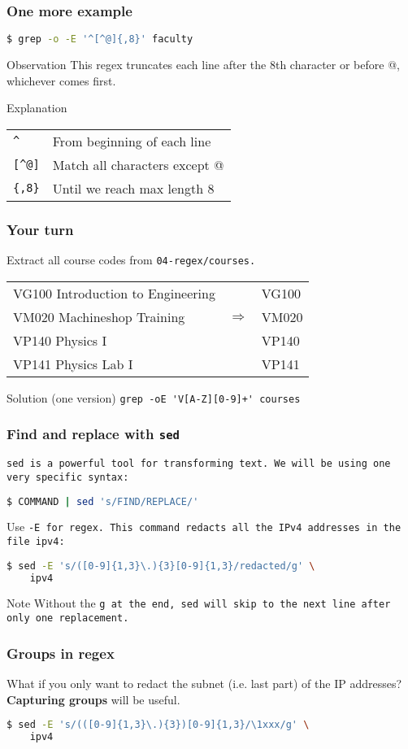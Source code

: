 \begin{frame}[fragile]
\frametitle{One more example}
\begin{lstlisting}[language=bash]
$ grep -o -E '^[^@]{,8}' faculty
\end{lstlisting}
\pause
\begin{block}{Observation}
    This regex truncates each line after the 8th character or before @,
    whichever comes first.
\end{block}
\begin{block}{Explanation}
    \begin{tabular}{ll}
        \verb|^|    & From beginning of each line \\
        \verb|[^@]| & Match all characters except @ \\
        \verb|{,8}| & Until we reach max length 8
    \end{tabular}
\end{block}
\end{frame}

\begin{frame}[fragile]
\frametitle{Your turn}
Extract all course codes from \tt{04-regex/courses}. \newline

\begin{tabular}{lcl}
    VG100 Introduction to Engineering & & VG100 \\
    VM020 Machineshop Training & $\Longrightarrow$ & VM020 \\
    VP140 Physics I & & VP140 \\
    VP141 Physics Lab I & & VP141
\end{tabular}
\pause
\begin{block}{Solution (one version)}
    \verb|grep -oE 'V[A-Z][0-9]+' courses|
\end{block}
\end{frame}

\begin{frame}[fragile]
\frametitle{Find and replace with \tt{sed}}
\tt{sed} is a powerful tool for transforming text.
We will be using one very specific syntax:
\begin{lstlisting}[language=bash]
$ COMMAND | sed 's/FIND/REPLACE/'
\end{lstlisting}
Use \tt{-E} for regex. This command redacts all the IPv4 addresses in the
file \tt{ipv4}:
\begin{lstlisting}[language=bash]
$ sed -E 's/([0-9]{1,3}\.){3}[0-9]{1,3}/redacted/g' \
    ipv4
\end{lstlisting}
\begin{block}{Note}
    Without the \tt{g} at the end, \tt{sed} will skip to the
    next line after only one replacement.
\end{block}
\end{frame}

\begin{frame}[fragile]
\frametitle{Groups in regex}
What if you only want to redact the subnet (i.e. last part) of the IP addresses?
\textbf{Capturing groups} will be useful.
\begin{lstlisting}[language=bash]
$ sed -E 's/(([0-9]{1,3}\.){3})[0-9]{1,3}/\1xxx/g' \
    ipv4
\end{lstlisting}
\end{frame}
